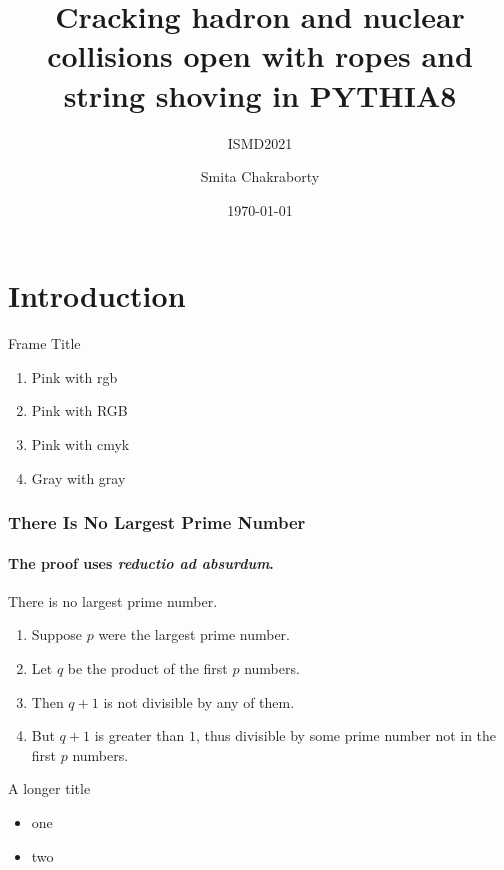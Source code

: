 \documentclass[aspectratio=169]{beamer}
\title{Cracking hadron and nuclear collisions open with ropes and string shoving in PYTHIA8 }
\subtitle{ISMD2021}
\author{Smita Chakraborty}
\date{\today}
\begin{document}
\maketitle

\section{Introduction}

\begin{frame}{Frame Title}
    \begin{enumerate}
\item \textcolor{Kolkatafg}{Pink with rgb}
\item \textcolor{Kolkatabg}{Pink with RGB}
\item \textcolor{Kolkatatxt}{Pink with cmyk}
\item \textcolor{mygray}{Gray with gray}
\end{enumerate}
\end{frame}

\begin{frame} 
\frametitle{There Is No Largest Prime Number} 
\framesubtitle{The proof uses \textit{reductio ad absurdum}.} 
\begin{theorem}
There is no largest prime number. \end{theorem} 
\begin{enumerate} 
\item<1-| alert@1> Suppose $p$ were the largest prime number. 
\item<2-> Let $q$ be the product of the first $p$ numbers. 
\item<3-> Then $q+1$ is not divisible by any of them. 
\item<1-> But $q + 1$ is greater than $1$, thus divisible by some prime
number not in the first $p$ numbers.
\end{enumerate}
\end{frame}

\begin{frame}{A longer title}
\begin{itemize}
\item one
\item two
\end{itemize}
\end{frame}
\end{document}
